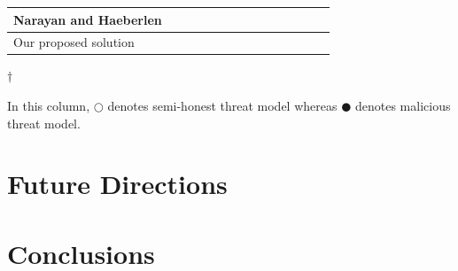 \documentclass[USenglish,oneside,twocolumn]{article}
\begin{document}
\begin{table}[!t]
{\begin{tabular}{|p{5.7cm}|p{1.0cm}|p{0.7cm}|p{1.4cm}|p{1.1cm}|p{1.4cm}|p{1.1cm}|p{0.7cm}|p{0.8cm}|p{0.6cm}|p{0.8cm}|p{0.6cm}|p{1.1cm}|p{1.5cm}|}
            \hline
            Narayan and Haeberlen &  & \centering{$\CIRCLE$} &  &  & \centering{$\CIRCLE$} &  &  & \centering{$\CIRCLE$} & & \centering{$\CIRCLE$} &  & \centering{$\Circle$} &  \tabularnewline
            \hline\hline
            Our proposed solution &  \centering{$\CIRCLE$} &  &  \centering{$\CIRCLE$} &  &  &  &  & \centering{$\CIRCLE$} & \centering{$\CIRCLE$} & \centering{$\CIRCLE$} & \centering{$\CIRCLE$} & \centering{$\CIRCLE$} & \centering{$\CIRCLE$} \tabularnewline
            \hline
        \end{tabular}
    }
    \vspace{0.01cm}
    \newline
    $\dagger$
    \fontsize{7pt}{12pt}\selectfont
    \raggedright In this column, $\Circle$ denotes semi-honest threat model whereas $\CIRCLE$ denotes malicious threat model.
\end{table}

\section{Future Directions}

\section{Conclusions}



\end{document}

